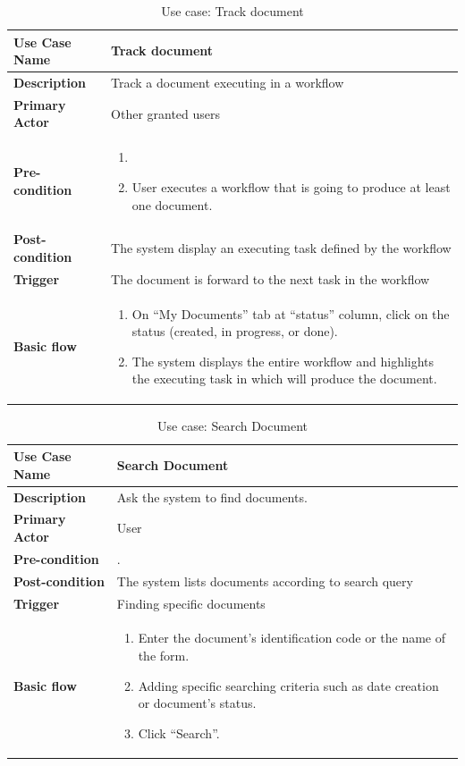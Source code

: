 \begin{table}
	\centering
	\caption{Use case: Track document}
	\begin{tabular}{|l|L{9cm}|}
		\hline
		\textbf{Use Case Name} & Track document \\
		\hline
		
		\textbf{Description} & Track a document executing in a workflow \\
		\textbf{Primary Actor} & Other granted users \\
		\textbf{Pre-condition} & 
		\begin{enumerate}
			\item \alreadylogin
			\item User executes a workflow that is going to produce at least one document.
		\end{enumerate} \\
		\textbf{Post-condition} & The system display an executing task defined by the workflow \\
		\textbf{Trigger} & The document is forward to the next task in the workflow \\
		\textbf{Basic flow} & 
		\begin{enumerate}
			\item On \enquote{My Documents} tab at \enquote{status} column, click on the status (created, in progress, or done).
			\item The system displays the entire workflow and highlights the executing task in which will produce the document.
		\end{enumerate} \\
		\hline
	\end{tabular}
\end{table}

\begin{table}
	\centering
	\caption{Use case: Search Document}
	\begin{tabular}{|l|L{9cm}|}
		\hline
		\textbf{Use Case Name} & Search Document \\
		\hline
		
		\textbf{Description} & Ask the system to find documents. \\
		\textbf{Primary Actor} & User \\
		\textbf{Pre-condition} & \alreadylogin. \\
		\textbf{Post-condition} & The system lists documents according to search query \\
		\textbf{Trigger} & Finding specific documents \\
		\textbf{Basic flow} & 
		\begin{enumerate}
			\item Enter the document's identification code or the name of the form.
			\item Adding specific searching criteria such as date creation or document's status.
			\item Click \enquote{Search}.
		\end{enumerate} \\
		\hline
	\end{tabular}
\end{table}

